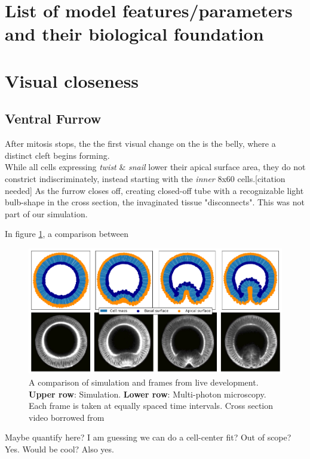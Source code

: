 \section{List of model features/parameters and their biological foundation}
\section{Visual closeness}
\subsection{Ventral Furrow}
After mitosis stops, the the first visual change on the is the belly, where a distinct cleft begins forming. \\

While all cells expressing \textit{twist} \& \textit{snail} lower their apical surface area, they do not constrict indiscriminately, instead starting with the \textit{inner} 8x60 cells.[citation needed] As the furrow closes off, creating closed-off tube with a recognizable light bulb-shape in the cross section, the invaginated tissue "disconnects". This was not part of our simulation.

In figure \ref{fig:VFComparison}, a comparison between

\begin{figure}[H]
    \centering
    \includegraphics[width=1\linewidth]{chapters/Results/figures/VF_comparison.png}
    \caption{A comparison of simulation and frames from live development. \textbf{Upper row}: Simulation. \textbf{Lower row}: Multi-photon microscopy. \\Each frame is taken at equally spaced time intervals. Cross section video borrowed from \cite{conte2012biomechanical}}
    \label{fig:VFComparison}
\end{figure}


Maybe quantify here?
I am guessing we can do a cell-center fit?
Out of scope? Yes. Would be cool? Also yes.
